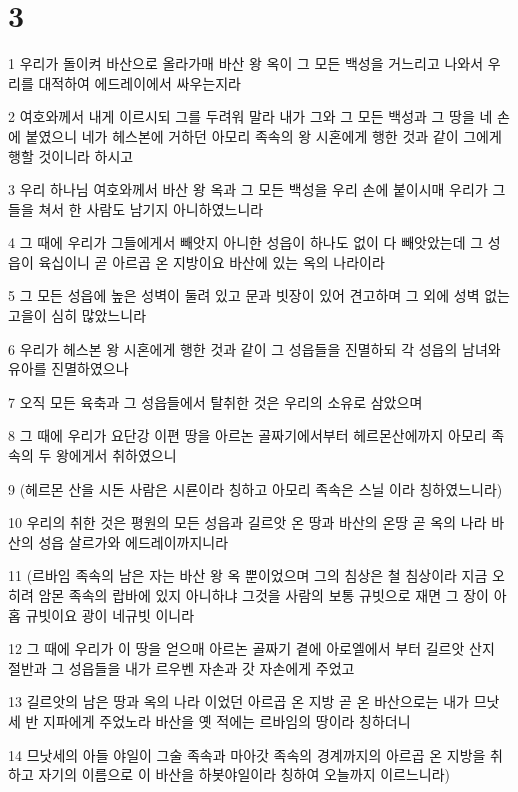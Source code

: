\chapter{3}

\par 1 우리가 돌이켜 바산으로 올라가매 바산 왕 옥이 그 모든 백성을 거느리고 나와서 우리를 대적하여 에드레이에서 싸우는지라
\par 2 여호와께서 내게 이르시되 그를 두려워 말라 내가 그와 그 모든 백성과 그 땅을 네 손에 붙였으니 네가 헤스본에 거하던 아모리 족속의 왕 시혼에게 행한 것과 같이 그에게 행할 것이니라 하시고
\par 3 우리 하나님 여호와께서 바산 왕 옥과 그 모든 백성을 우리 손에 붙이시매 우리가 그들을 쳐서 한 사람도 남기지 아니하였느니라
\par 4 그 때에 우리가 그들에게서 빼앗지 아니한 성읍이 하나도 없이 다 빼앗았는데 그 성읍이 육십이니 곧 아르곱 온 지방이요 바산에 있는 옥의 나라이라
\par 5 그 모든 성읍에 높은 성벽이 둘려 있고 문과 빗장이 있어 견고하며 그 외에 성벽 없는 고을이 심히 많았느니라
\par 6 우리가 헤스본 왕 시혼에게 행한 것과 같이 그 성읍들을 진멸하되 각 성읍의 남녀와 유아를 진멸하였으나
\par 7 오직 모든 육축과 그 성읍들에서 탈취한 것은 우리의 소유로 삼았으며
\par 8 그 때에 우리가 요단강 이편 땅을 아르논 골짜기에서부터 헤르몬산에까지 아모리 족속의 두 왕에게서 취하였으니
\par 9 (헤르몬 산을 시돈 사람은 시룐이라 칭하고 아모리 족속은 스닐 이라 칭하였느니라)
\par 10 우리의 취한 것은 평원의 모든 성읍과 길르앗 온 땅과 바산의 온땅 곧 옥의 나라 바산의 성읍 살르가와 에드레이까지니라
\par 11 (르바임 족속의 남은 자는 바산 왕 옥 뿐이었으며 그의 침상은 철 침상이라 지금 오히려 암몬 족속의 랍바에 있지 아니하냐 그것을 사람의 보통 규빗으로 재면 그 장이 아홉 규빗이요 광이 네규빗 이니라
\par 12 그 때에 우리가 이 땅을 얻으매 아르논 골짜기 곁에 아로엘에서 부터 길르앗 산지 절반과 그 성읍들을 내가 르우벤 자손과 갓 자손에게 주었고
\par 13 길르앗의 남은 땅과 옥의 나라 이었던 아르곱 온 지방 곧 온 바산으로는 내가 므낫세 반 지파에게 주었노라 바산을 옛 적에는 르바임의 땅이라 칭하더니
\par 14 므낫세의 아들 야일이 그술 족속과 마아갓 족속의 경계까지의 아르곱 온 지방을 취하고 자기의 이름으로 이 바산을 하봇야일이라 칭하여 오늘까지 이르느니라)
